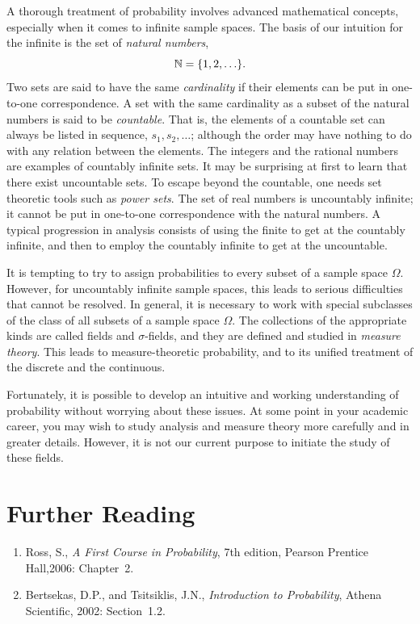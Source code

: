 A thorough treatment of probability involves advanced mathematical concepts, especially when it comes to infinite sample spaces.
The basis of our intuition for the infinite is the set of \emph{natural numbers},
\begin{equation*}
\mathbb{N} = \{ 1, 2, \ldots \}.
\end{equation*}
Two sets are said to have the same \emph{cardinality} if their elements can be put in one-to-one correspondence.
A set with the same cardinality as a subset of the natural numbers is said to be \emph{countable}.
That is, the elements of a countable set can always be listed in sequence, $s_1, s_2, \ldots$; although the order may have nothing to do with any relation between the elements.
The integers and the rational numbers are examples of countably infinite sets.
It may be surprising at first to learn that there exist uncountable sets.
To escape beyond the countable, one needs set theoretic tools such as \emph{power sets}.
The set of real numbers is uncountably infinite; it cannot be put in one-to-one correspondence with the natural numbers.
A typical progression in analysis consists of using the finite to get at the countably infinite, and then to employ the countably infinite to get at the uncountable.

It is tempting to try to assign probabilities to every subset of a sample space $\Omega$.
However, for uncountably infinite sample spaces, this leads to serious difficulties that cannot be resolved.
In general, it is necessary to work with special subclasses of the class of all subsets of a sample space $\Omega$.
The collections of the appropriate kinds are called fields and $\sigma$-fields, and they are defined and studied in \emph{measure theory}.
This leads to measure-theoretic probability, and to its unified treatment of the discrete and the continuous.

Fortunately, it is possible to develop an intuitive and working understanding of probability without worrying about these issues.
At some point in your academic career, you may wish to study analysis and measure theory more carefully and in greater details.
However, it is not our current purpose to initiate the study of these fields.


\section*{Further Reading}

\begin{small}
\begin{enumerate}
\item Ross, S., \emph{A First Course in Probability}, 7th edition, Pearson Prentice Hall,2006: Chapter~2.
\item Bertsekas, D.P., and Tsitsiklis, J.N., \emph{Introduction to Probability}, Athena Scientific, 2002: Section~1.2.
\end{enumerate}
\end{small}

